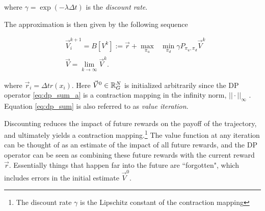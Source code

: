 \noindent where $\gamma=\exp(-\lambda \Delta t)$ is the \emph{discount rate}.

The approximation is then given by the following sequence

\begin{subequations}\label{eq:dp_sum}
\begin{align}
&\vec{V}_{i}^{k+1} = B[V^k] := \vec{r} +  \underset{\pi_u}{\max}\text{ }\underset{ \pi_d}{\min} \gamma P_{\pi_u, \pi_d} \vec{V}^k  \label{eq:dp_sum_a}\\
&\vec{V} = \lim_{k\rightarrow \infty} \vec{V}^{k}.
\end{align}
\end{subequations}

\noindent where $\vec{r}_i =\Delta t r(x_i)$. Here $\vec{V}^{0} \in \mathbb{R}^N_G$ is initialized arbitrarily since the DP operator \eqref{eq:dp_sum_a} is a contraction mapping in the infinity norm, $||\cdot||_\infty$ \cite{Bertsekas1995}. Equation \eqref{eq:dp_sum} is also referred to as \emph{value iteration}.

Discounting reduces the impact of future rewards on the payoff of the trajectory, and ultimately yields a contraction mapping.\footnote{The discount rate $\gamma$ is the Lipschitz constant of the contraction mapping} The value function at any iteration can be thought of as an estimate of the impact of all future rewards, and the DP operator can be seen as combining these future rewards with the current reward $\vec{r}$. Essentially things that happen far into the future are ``forgotten", which includes errors in the initial estimate $\vec{V}^0$.  




